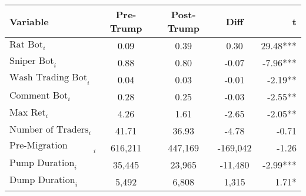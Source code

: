 \begin{tabular}{lcccr}
\toprule
Variable & Pre-Trump & Post-Trump & Diff & t \\
\midrule
$\text{Rat Bot}_{i}$ & 0.09 & 0.39 & 0.30 & 29.48*** \\
$\text{Sniper Bot}_{i}$ & 0.88 & 0.80 & -0.07 & -7.96*** \\
$\text{Wash Trading Bot}_{i}$ & 0.04 & 0.03 & -0.01 & -2.19** \\
$\text{Comment Bot}_{i}$ & 0.28 & 0.25 & -0.03 & -2.55** \\
$\text{Max Ret}_{i}$ & 4.26 & 1.61 & -2.65 & -2.05** \\
$\text{Number of Traders}_{i}$ & 41.71 & 36.93 & -4.78 & -0.71 \\
$\text{Pre-Migration Duration}_{i}$ & 616,211 & 447,169 & -169,042 & -1.26 \\
$\text{Pump Duration}_{i}$ & 35,445 & 23,965 & -11,480 & -2.99*** \\
$\text{Dump Duration}_{i}$ & 5,492 & 6,808 & 1,315 & 1.71* \\
\bottomrule
\end{tabular}
